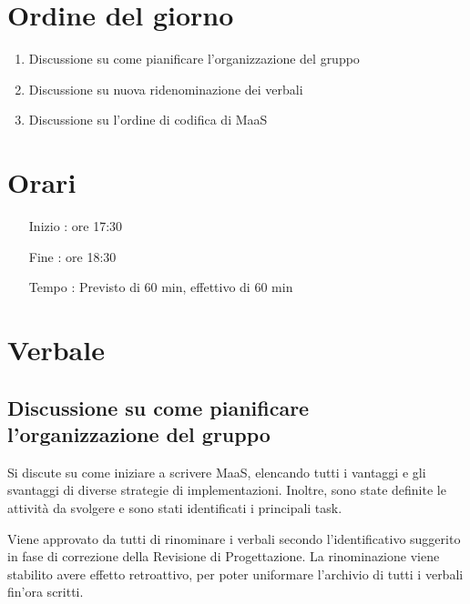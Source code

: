 \documentclass[11pt]{meetingmins}
\begin{document}
\maketitle

\section{Ordine del giorno}

\begin{enumerate}

\item Discussione su come pianificare l'organizzazione del gruppo

\item Discussione su nuova ridenominazione dei verbali

\item Discussione su l'ordine di codifica di MaaS

\end{enumerate}

\section{Orari}

\begin{itemize}
\item[Inizio]: ore 17:30
\item[Fine]: ore 18:30
\item[Tempo]: Previsto di 60 min, effettivo di 60 min

\end{itemize}

\section{Verbale}

\subsection{Discussione su come pianificare l'organizzazione del gruppo}

Si discute su come iniziare a scrivere MaaS, elencando tutti i vantaggi e gli svantaggi di diverse strategie di implementazioni. Inoltre, sono state definite le attività da svolgere e sono stati identificati i principali task.


Viene approvato da tutti di rinominare i verbali secondo l'identificativo suggerito in fase di correzione della Revisione di Progettazione. La rinominazione viene stabilito avere effetto retroattivo, per poter uniformare l'archivio di tutti i verbali fin'ora scritti.
\end{document}
